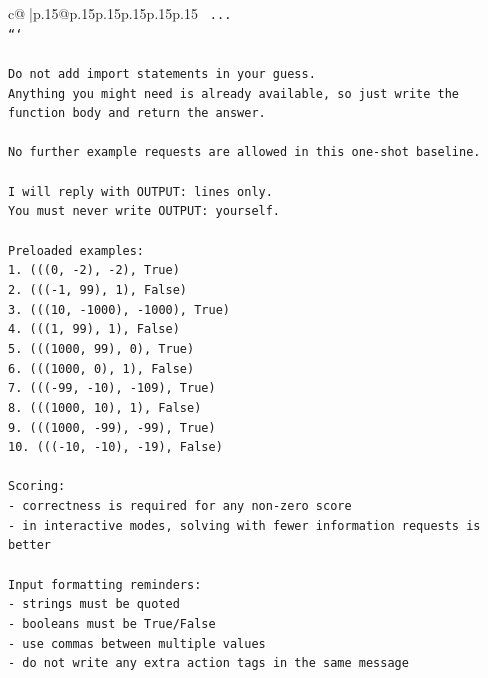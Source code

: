 \documentclass{article}
\begin{document}
{\begin{supertabular}{c@{$\;$}|p{.15\linewidth}@{}p{.15\linewidth}p{.15\linewidth}p{.15\linewidth}p{.15\linewidth}p{.15\linewidth}}
{{{\texttt{    ...} \\
\texttt{```} \\
\\ 
\texttt{Do not add import statements in your guess.} \\
\texttt{Anything you might need is already available, so just write the function body and return the answer.} \\
\\ 
\texttt{No further example requests are allowed in this one{-}shot baseline.} \\
\\ 
\texttt{I will reply with OUTPUT: lines only.} \\
\texttt{You must never write OUTPUT: yourself.} \\
\\ 
\texttt{Preloaded examples:} \\
\texttt{1. (((0, {-}2), {-}2), True)} \\
\texttt{2. ((({-}1, 99), 1), False)} \\
\texttt{3. (((10, {-}1000), {-}1000), True)} \\
\texttt{4. (((1, 99), 1), False)} \\
\texttt{5. (((1000, 99), 0), True)} \\
\texttt{6. (((1000, 0), 1), False)} \\
\texttt{7. ((({-}99, {-}10), {-}109), True)} \\
\texttt{8. (((1000, 10), 1), False)} \\
\texttt{9. (((1000, {-}99), {-}99), True)} \\
\texttt{10. ((({-}10, {-}10), {-}19), False)} \\
\\ 
\texttt{Scoring:} \\
\texttt{{-} correctness is required for any non{-}zero score} \\
\texttt{{-} in interactive modes, solving with fewer information requests is better} \\
\\ 
\texttt{Input formatting reminders:} \\
\texttt{{-} strings must be quoted} \\
\texttt{{-} booleans must be True/False} \\
\texttt{{-} use commas between multiple values} \\
\texttt{{-} do not write any extra action tags in the same message} \\
\\ 
}}}
\end{supertabular}}
\end{document}
